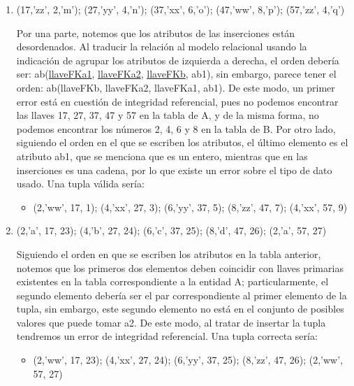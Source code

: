 \begin{enumerate}[label=\textbf{\alph*.}]
\begin{enumerate}[label=\roman*.]
    En este caso, notemos que la tupla 3 y 5 son iguales, de modo que al tratar de insertar la última tupla, los valores de las llaves se repetirán y se marcará un error por duplicado de llaves. Para solucionarlo, basta con modificar el valor de 27 en la última tupla por cualquier otro disponible, como 17. De este modo, una tupla válida sería la siguiente:
    \begin{itemize}
        \item (8,'zz', 17, 5); (6,'yy', 57, 10); (4,'xx', 27, 15); (2,'ww', 37, 20); (4,'xx', 17, 15)
    \end{itemize}
    
    \item (17,'zz', 2,'m'); (27,'yy', 4,'n'); (37,'xx', 6,'o'); (47,'ww', 8,'p'); (57,'zz', 4,'q')
    
      Por una parte, notemos que los atributos de las inserciones están desordenados. Al traducir la relación al modelo relacional usando la indicación de agrupar los atributos de izquierda a derecha, el orden debería ser: ab(\underline{llaveFKa1}, \underline{llaveFKa2}, \underline{llaveFKb}, ab1), sin embargo, parece tener el orden: ab(llaveFKb, llaveFKa2, llaveFKa1, ab1). De este modo, un primer error está en cuestión de integridad referencial, pues no podemos encontrar las llaves 17, 27, 37, 47 y 57 en la tabla de A, y de la misma forma, no podemos encontrar los números 2, 4, 6 y 8 en la tabla de B. Por otro lado, siguiendo el orden en el que se escriben los atributos, el último elemento es el atributo ab1, que se menciona que es un entero, mientras que en las inserciones es una cadena, por lo que existe un error sobre el tipo de dato usado. Una tupla válida sería:
    \begin{itemize}       
        \item (2,'ww', 17, 1); (4,'xx', 27, 3); (6,'yy', 37, 5); (8,'zz', 47, 7); (4,'xx', 57, 9)   
    \end{itemize}

    
    \item (2,'a', 17, 23); (4,'b', 27, 24); (6,'c', 37, 25); (8,'d', 47, 26); (2,'a', 57, 27)
    
    Siguiendo el orden en que se escriben los atributos en la tabla anterior, notemos que los primeros dos elementos deben coincidir con llaves primarias existentes en la tabla correspondiente a la entidad A; particularmente, el segundo elemento debería ser el par correspondiente al primer elemento de la tupla, sin embargo, este segundo elemento no está en el conjunto de posibles valores que puede tomar a2. De este modo, al tratar de insertar la tupla tendremos un error de integridad referencial. Una tupla correcta sería:
    \begin{itemize}
        \item (2,'ww', 17, 23); (4,'xx', 27, 24); (6,'yy', 37, 25); (8,'zz', 47, 26); (2,'ww', 57, 27)
    \end{itemize}
    

\end{enumerate}
\end{enumerate}
